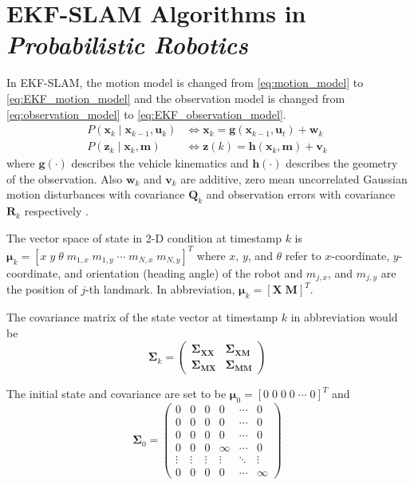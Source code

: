 \documentclass[conference]{IEEEtran}
\begin{document}
\section{EKF-SLAM Algorithms in \textit{Probabilistic Robotics}}
\par In EKF-SLAM, the motion model is changed from \eqref{eq:motion_model} to \eqref{eq:EKF_motion_model} and the observation model is changed from \eqref{eq:observation_model} to \eqref{eq:EKF_observation_model}.
	\begin{align}
		P(\mathbf{x}_{k} \;\vert\; \mathbf{x}_{k-1}, \mathbf{u}_{k}) & \Longleftrightarrow \mathbf{x}_{k} = \mathbf{g}(\mathbf{x}_{k-1}, \mathbf{u}_{t}) + \mathbf{w}_{k} \label{eq:EKF_motion_model} \\
		P(\mathbf{z}_{k} \;\vert\; \mathbf{x}_{k}, \mathbf{m}) & \Longleftrightarrow \mathbf{z}(k) = \mathbf{h}(\mathbf{x}_{k}, \mathbf{m}) + \mathbf{v}_{k} \label{eq:EKF_observation_model}
	\end{align}
where $\mathbf{g}(\cdot)$ describes the vehicle kinematics and $\mathbf{h}(\cdot)$ describes the geometry of the observation. Also $\mathbf{w}_{k}$ and $\mathbf{v}_{k}$ are additive, zero mean uncorrelated Gaussian motion disturbances with covariance $\mathbf{Q}_{k}$ and observation errors with covariance $\mathbf{R}_{k}$ respectively \cite{EKF-SLAM-02}.
\par The vector space of state in 2-D condition at timestamp $k$ is $\bm{\mu}_{k} = \left[x \; y \; \theta \; m_{1,x} \; m_{1,y} \; \cdots \; m_{N,x} \; m_{N,y} \right]^{T}$ where $x$, $y$, and $\theta$ refer to $x$-coordinate, $y$-coordinate, and orientation (heading angle) of the robot and $m_{j,x}$, and $m_{j,y}$ are the position of $j$-th landmark. In abbreviation, $\bm{\mu}_{k} = \left[ \mathbf{X} \; \mathbf{M} \right]^{T}$.
\par The covariance matrix of the state vector at timestamp $k$ in abbreviation would be
$$
\bm{\Sigma}_{k} = \begin{pmatrix}
\mathbf{\Sigma}_{\mathbf{X}\mathbf{X}} & \mathbf{\Sigma}_{\mathbf{X}\mathbf{M}} \\
\mathbf{\Sigma}_{\mathbf{M}\mathbf{X}} & \mathbf{\Sigma}_{\mathbf{M}\mathbf{M}}
\end{pmatrix}
$$
\par The initial state and covariance are set to be $\bm{\mu}_{0} = \left[0 \; 0 \; 0 \; 0 \; \cdots \; 0 \right]^{T}$ and
$$
\bm{\Sigma}_{0} = \begin{pmatrix}
0 		& 0 	 & 0 	  & 0 	   & \cdots & 0 	 \\
0 		& 0 	 & 0 	  & 0 	   & \cdots & 0 	 \\
0 		& 0 	 & 0 	  & 0 	   & \cdots & 0 	 \\
0 		& 0 	 & 0 	  & \infty & \cdots & 0 	 \\
\vdots 	& \vdots & \vdots & \vdots & \ddots & \vdots \\
0 		& 0 	 & 0 	  &	0 	   & \cdots	& \infty
\end{pmatrix}
$$
\end{document}
